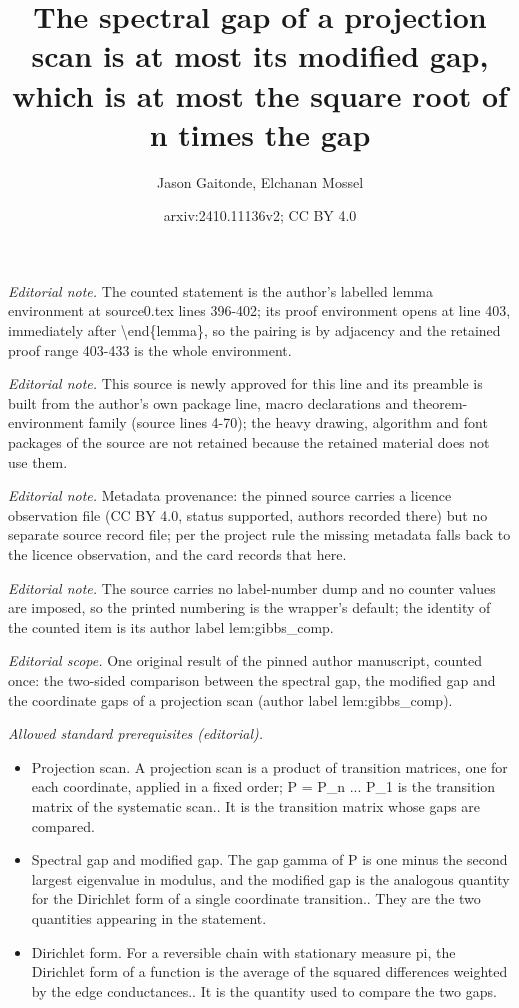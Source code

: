\documentclass[10pt,a4paper]{article}
\title{The spectral gap of a projection scan is at most its modified gap, which is at most the square root of n times the gap}
\author{Jason Gaitonde, Elchanan Mossel}
\date{arxiv:2410.11136v2; CC BY 4.0}
\begin{document}
\maketitle
\noindent\textit{Editorial note.} The counted statement is the author's labelled lemma environment at source0.tex lines 396-402; its proof environment opens at line 403, immediately after \textbackslash{}end\{lemma\}, so the pairing is by adjacency and the retained proof range 403-433 is the whole environment.\par\medskip
\noindent\textit{Editorial note.} This source is newly approved for this line and its preamble is built from the author's own package line, macro declarations and theorem-environment family (source lines 4-70); the heavy drawing, algorithm and font packages of the source are not retained because the retained material does not use them.\par\medskip
\noindent\textit{Editorial note.} Metadata provenance: the pinned source carries a licence observation file (CC BY 4.0, status supported, authors recorded there) but no separate source record file; per the project rule the missing metadata falls back to the licence observation, and the card records that here.\par\medskip
\noindent\textit{Editorial note.} The source carries no label-number dump and no counter values are imposed, so the printed numbering is the wrapper's default; the identity of the counted item is its author label lem:gibbs\_comp.\par\medskip
\noindent\textit{Editorial scope.} One original result of the pinned author manuscript, counted once: the two-sided comparison between the spectral gap, the modified gap and the coordinate gaps of a projection scan (author label lem:gibbs\_comp).\par\medskip
\noindent\textit{Allowed standard prerequisites (editorial).}\begin{itemize}
\item Projection scan. A projection scan is a product of transition matrices, one for each coordinate, applied in a fixed order; P = P\_n ... P\_1 is the transition matrix of the systematic scan.. It is the transition matrix whose gaps are compared.
\item Spectral gap and modified gap. The gap gamma of P is one minus the second largest eigenvalue in modulus, and the modified gap is the analogous quantity for the Dirichlet form of a single coordinate transition.. They are the two quantities appearing in the statement.
\item Dirichlet form. For a reversible chain with stationary measure pi, the Dirichlet form of a function is the average of the squared differences weighted by the edge conductances.. It is the quantity used to compare the two gaps.
\end{itemize}\medskip
\end{document}
